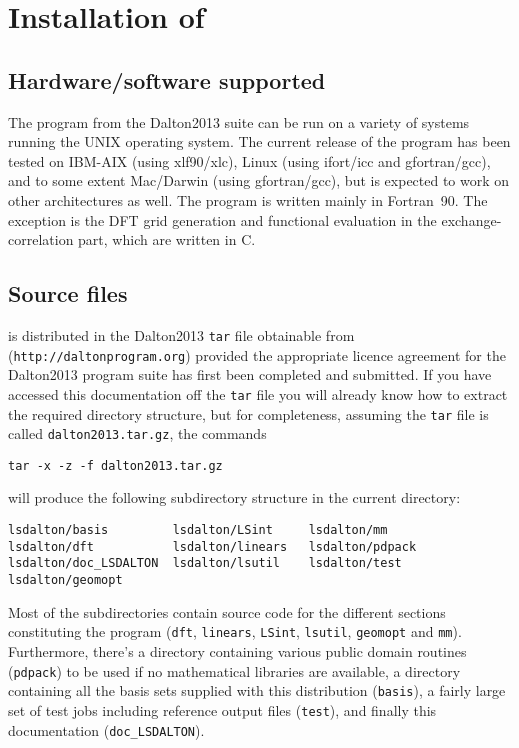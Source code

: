 \chapter{Installation of \lsdalton}\label{ch:install}

\section{Hardware/software
supported}\label{sec:hardsoft}

The {\lsdalton} program from the Dalton2013 suite
can be run on a variety of systems running the UNIX
operating system. The current release of the program 
has been tested on 
IBM-AIX (using xlf90/xlc),
Linux (using ifort/icc and gfortran/gcc), 
and to some extent Mac/Darwin (using gfortran/gcc), but is
expected to work on other architectures as well. 
The program is written mainly in Fortran~90.
The exception is the DFT grid generation and functional evaluation in the 
exchange-correlation part, which are written in C.

\section{Source files}\label{sec:source}

{\lsdalton} is distributed in the Dalton2013 \verb|tar| file obtainable from
(\verb|http://daltonprogram.org|) provided the appropriate
licence agreement for the Dalton2013 program suite has first been
completed and submitted.
If you have accessed this documentation off the
\verb|tar| file you will
already know how to extract the required directory structure, but
for completeness, assuming the \verb|tar| file is called
\verb|dalton2013.tar.gz|, the commands
\begin{verbatim}
tar -x -z -f dalton2013.tar.gz
\end{verbatim}
will produce the following subdirectory structure in the current
directory:
\begin{verbatim}
lsdalton/basis         lsdalton/LSint     lsdalton/mm
lsdalton/dft           lsdalton/linears   lsdalton/pdpack               
lsdalton/doc_LSDALTON  lsdalton/lsutil    lsdalton/test            
lsdalton/geomopt
\end{verbatim}
Most of the subdirectories contain source code for the different sections
constituting the {\lsdalton} program (\verb|dft|, \verb|linears|, 
\verb|LSint|, \verb|lsutil|, \verb|geomopt| and \verb|mm|). Furthermore,
there's a directory containing
various public domain routines (\verb|pdpack|) to be used if no 
mathematical libraries are available, a directory containing
all the basis sets supplied with this distribution (\verb|basis|), a
fairly large set of test jobs including reference output files
(\verb|test|), and finally this documentation (\verb|doc_LSDALTON|). 

